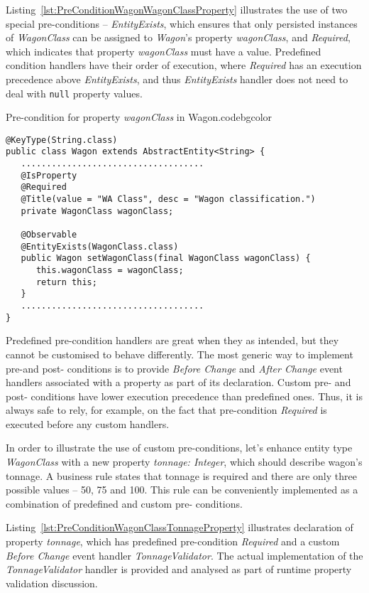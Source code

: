   Listing~\ref{lst:PreConditionWagonWagonClassProperty} illustrates the use of two special pre-conditions -- \emph{EntityExists}, which ensures that only persisted instances of \emph{WagonClass} can be assigned to \emph{Wagon}'s property \emph{wagonClass}, and \emph{Required}, which indicates that property \emph{wagonClass} must have a value.
  Predefined condition handlers have their order of execution, where \emph{Required} has an execution precedence above \emph{EntityExists}, and thus \emph{EntityExists} handler does not need to deal with \texttt{null} property values.

  \begin{code}{Pre-condition for property \emph{wagonClass} in Wagon.}{\label{lst:PreConditionWagonWagonClassProperty}}{codebgcolor}
    \begin{lstlisting}
@KeyType(String.class)
public class Wagon extends AbstractEntity<String> {  
   ....................................
   @IsProperty
   @Required
   @Title(value = "WA Class", desc = "Wagon classification.")
   private WagonClass wagonClass;

   @Observable
   @EntityExists(WagonClass.class)
   public Wagon setWagonClass(final WagonClass wagonClass) {
      this.wagonClass = wagonClass;
      return this;
   }
   ....................................
}
    \end{lstlisting}
  \end{code}

  Predefined pre-condition handlers are great when they as intended, but they cannot be customised to behave differently.
  The most generic way to implement pre-and post- conditions is to provide \emph{Before Change} and \emph{After Change} event handlers associated with a property as part of its declaration.
  Custom pre- and post- conditions have lower execution precedence than predefined ones.  
  Thus, it is always safe to rely, for example, on the fact that pre-condition \emph{Required} is executed before any custom handlers.

  In order to illustrate the use of custom pre-conditions, let's enhance entity type \emph{WagonClass} with a new property \emph{tonnage: Integer}, which should describe wagon's tonnage.
  A business rule states that tonnage is required and there are only three possible values -- 50, 75 and 100.
  This rule can be conveniently implemented as a combination of predefined and custom pre- conditions.
  
  Listing~\ref{lst:PreConditionWagonClassTonnageProperty} illustrates declaration of property \emph{tonnage}, which has predefined pre-condition \emph{Required} and a custom \emph{Before Change} event handler \emph{TonnageValidator}.
  The actual implementation of the \emph{TonnageValidator} handler is provided and analysed as part of runtime property validation discussion.
  
